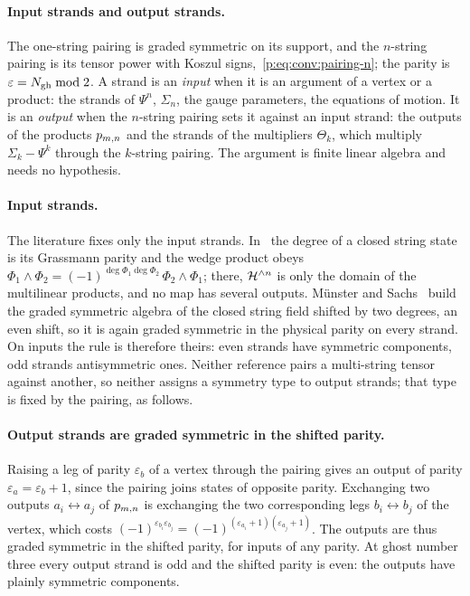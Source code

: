 \paragraph{Input strands and output strands.}
The one-string pairing is graded symmetric on its support, and the $n$-string pairing is its tensor power with Koszul signs,~\eqref{p:eq:conv:pairing-n}; the parity is $\varepsilon = N_{\text{gh}} \bmod 2$.
A strand is an \emph{input} when it is an argument of a vertex or a product: the strands of $\Psi^n$, $\Sigma_n$, the gauge parameters, the equations of motion.
It is an \emph{output} when the $n$-string pairing sets it against an input strand: the outputs of the products $p_{m,n}$ and the strands of the multipliers $\Theta_k$, which multiply $\Sigma_k - \Psi^k$ through the $k$-string pairing.
The argument is finite linear algebra and needs no hypothesis.

\paragraph{Input strands.}
The literature fixes only the input strands.
In~\cite{Erler:2014:NSNSSectorClosed} the degree of a closed string state is its Grassmann parity and the wedge product obeys $\Phi_1 \wedge \Phi_2 = (-1)^{\deg \Phi_1 \deg \Phi_2} \, \Phi_2 \wedge \Phi_1$; there, $\mathcal{H}^{\wedge n}$ is only the domain of the multilinear products, and no map has several outputs.
Münster and Sachs~\cite{Muenster:2012:HomotopyAlgebrasString-kn} build the graded symmetric algebra of the closed string field shifted by two degrees, an even shift, so it is again graded symmetric in the physical parity on every strand.
On inputs the rule is therefore theirs: even strands have symmetric components, odd strands antisymmetric ones.
Neither reference pairs a multi-string tensor against another, so neither assigns a symmetry type to output strands; that type is fixed by the pairing, as follows.

\paragraph{Output strands are graded symmetric in the shifted parity.}
Raising a leg of parity $\varepsilon_b$ of a vertex through the pairing gives an output of parity $\varepsilon_a = \varepsilon_b + 1$, since the pairing joins states of opposite parity.
Exchanging two outputs $a_i \leftrightarrow a_j$ of $p_{m,n}$ is exchanging the two corresponding legs $b_i \leftrightarrow b_j$ of the vertex, which costs $(-1)^{\varepsilon_{b_i} \varepsilon_{b_j}} = (-1)^{(\varepsilon_{a_i} + 1) (\varepsilon_{a_j} + 1)}$.
The outputs are thus graded symmetric in the shifted parity, for inputs of any parity.
At ghost number three every output strand is odd and the shifted parity is even: the outputs have plainly symmetric components.

